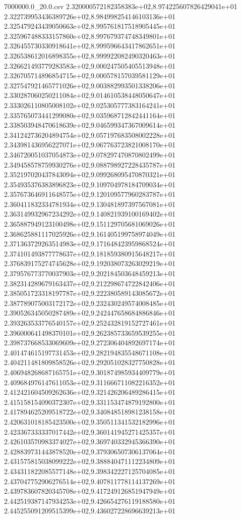 \begin{filecontents*}{7000000.0_20.0.csv}
2.320000572182358383e+02,8.974225607826429041e+01
2.322739953436389726e+02,8.984998254146103136e+01
2.325479243439050663e+02,8.995761817518905445e+01
2.325967488333157860e+02,8.997679374748349801e+01
2.326455730330918641e+02,8.999596643417862651e+01
2.326538612016898355e+02,8.999922082490320463e+01
2.326621493779283583e+02,9.000247505405513948e+01
2.326705714896854715e+02,9.000578157039581129e+01
2.327547921465771026e+02,9.003882993501338206e+01
2.330287060250211084e+02,9.014610538448050647e+01
2.333026110805008102e+02,9.025305777383164241e+01
2.335765073441299080e+02,9.035968712842441164e+01
2.338503948470618639e+02,9.046599347367009614e+01
2.341242736204894754e+02,9.057197683508002228e+01
2.343981436956227071e+02,9.067763723821008170e+01
2.346720051037054873e+02,9.078297470870802499e+01
2.349458578759930276e+02,9.088798927228435787e+01
2.352197020437843094e+02,9.099268095470870321e+01
2.354935376383896823e+02,9.109704978184709034e+01
2.357673646911648575e+02,9.120109577960283787e+01
2.360411832334781934e+02,9.130481897397567081e+01
2.363149932967234292e+02,9.140821939100169402e+01
2.365887949123100498e+02,9.151129705681069026e+01
2.368625881117025926e+02,9.161405199758974049e+01
2.371363729263514983e+02,9.171648423959868524e+01
2.374101493877778637e+02,9.181859380915648217e+01
2.376839175274745628e+02,9.192038073263029219e+01
2.379576773770037903e+02,9.202184503648459213e+01
2.382314289679163437e+02,9.212298674722842406e+01
2.385051723318197787e+02,9.222380589143085672e+01
2.387789075003172172e+02,9.232430249574008485e+01
2.390526345050287489e+02,9.242447658684886846e+01
2.393263533776540157e+02,9.252432819152727461e+01
2.396000641498370101e+02,9.262385733659539255e+01
2.398737668533069609e+02,9.272306404892697174e+01
2.401474615197731453e+02,9.282194835548671108e+01
2.404211481809858526e+02,9.292051028327750828e+01
2.406948268687165751e+02,9.301874985934409779e+01
2.409684976147611053e+02,9.311666711082216352e+01
2.412421604509262636e+02,9.321426206489286415e+01
2.415158154090372307e+02,9.331153474879192800e+01
2.417894625209518722e+02,9.340848518981238158e+01
2.420631018185423500e+02,9.350511341532182996e+01
2.423367333337017442e+02,9.360141945271425357e+01
2.426103570983374027e+02,9.369740332945366390e+01
2.428839731443878520e+02,9.379306507306137064e+01
2.431575815038099222e+02,9.388840471112234809e+01
2.434311822085577148e+02,9.398342227125704085e+01
2.437047752906276514e+02,9.407811778114137269e+01
2.439783607820345708e+02,9.417249126851947949e+01
2.442519387147934253e+02,9.426654276119188580e+01
2.445255091209515399e+02,9.436027228696639213e+01

\end{filecontents*}
